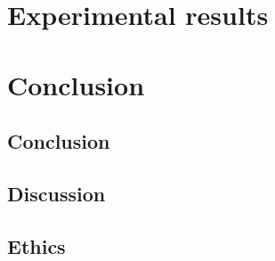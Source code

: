 \documentclass[twoside]{Style/uva-inf-bachelor-thesis}
\begin{document}
\chapter{Experimental results}\label{chap:experiments}

% 


\chapter{Conclusion}\label{chap:conclusion}
\section{Conclusion}
\section{Discussion}
\section{Ethics}


\printbibliography
\end{document}
